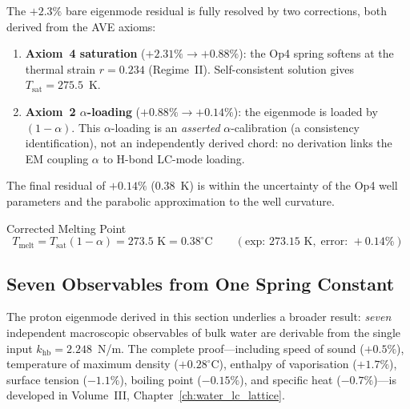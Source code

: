 The $+2.3\%$ bare eigenmode residual is fully resolved by two corrections, both derived from the AVE axioms:
\begin{enumerate}
  \item \textbf{Axiom~4 saturation} ($+2.31\% \to +0.88\%$): the Op4 spring softens at the thermal strain $r = 0.234$ (Regime~II). Self-consistent solution gives $T_\text{sat} = 275.5$~K.
  \item \textbf{Axiom~2 $\alpha$-loading} ($+0.88\% \to +0.14\%$): the eigenmode is loaded by $(1-\alpha)$. This $\alpha$-loading is an \emph{asserted} $\alpha$-calibration (a consistency identification), not an independently derived chord: no derivation links the EM coupling $\alpha$ to H-bond LC-mode loading.
\end{enumerate}

The final residual of $+0.14\%$ ($0.38$~K) is within the uncertainty of the Op4 well parameters and the parabolic approximation to the well curvature.

\begin{resultbox}{Corrected Melting Point}
\begin{equation}
  T_\text{melt} = T_\text{sat}(1-\alpha) = 273.5 \text{ K} = 0.38^{\circ}\text{C}
  \qquad (\text{exp: } 273.15 \text{ K}, \; \text{error: } +0.14\%)
\end{equation}
\end{resultbox}

\subsection{Seven Observables from One Spring Constant}

The proton eigenmode derived in this section underlies a broader result: \emph{seven} independent macroscopic observables of bulk water are derivable from the single input $k_\text{hb} = 2.248$~N/m. The complete proof---including speed of sound ($+0.5\%$), temperature of maximum density ($+0.28^{\circ}$C), enthalpy of vaporisation ($+1.7\%$), surface tension ($-1.1\%$), boiling point ($-0.15\%$), and specific heat ($-0.7\%$)---is developed in Volume~III, Chapter~\ref{ch:water_lc_lattice}.

